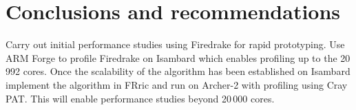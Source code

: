 \documentclass[a4paper,titlepage]{article}
\begin{document}
\section{Conclusions and recommendations}
\label{section:conclusions}

Carry out initial performance studies using Firedrake for rapid prototyping. Use ARM Forge to profile Firedrake on  Isambard which enables profiling up to the 20\,992 cores. Once the scalability of the algorithm has been established on Isambard implement the algorithm in FRric and run on Archer-2 with profiling using Cray PAT. This will enable performance studies beyond 20\,000 cores.

\end{document}
